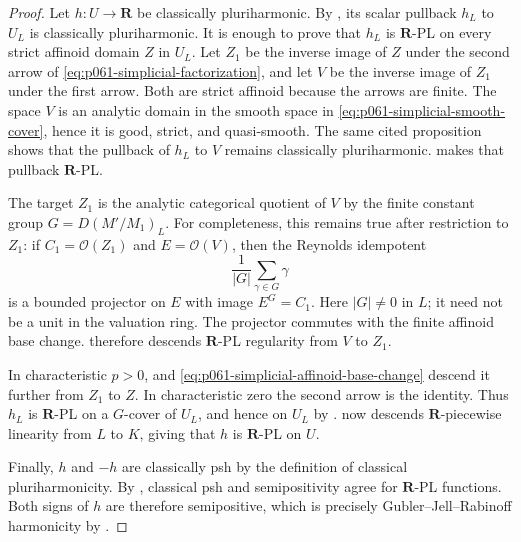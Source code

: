 \begin{proof}
Let \(h:U\to\mathbf R\) be classically pluriharmonic.  By
\cite[Proposition~7.2(6),(7)]{GR25Classical}, its scalar pullback \(h_L\)
to \(U_L\) is classically pluriharmonic.  It is enough to prove that \(h_L\)
is \(\mathbf R\)-PL on every strict affinoid domain \(Z\) in \(U_L\).  Let
\(Z_1\) be the inverse image of \(Z\) under the second arrow of
\eqref{eq:p061-simplicial-factorization}, and let \(V\) be the inverse image
of \(Z_1\) under the first arrow.  Both are strict affinoid because the
arrows are finite.  The space \(V\) is an analytic domain in the smooth
space in \eqref{eq:p061-simplicial-smooth-cover}, hence it is good, strict,
and quasi-smooth.  The same cited proposition shows that the pullback of
\(h_L\) to \(V\) remains classically pluriharmonic.
 makes that pullback \(\mathbf R\)-PL.

The target \(Z_1\) is the analytic categorical quotient of \(V\) by the
finite constant group \(G=D(M'/M_1)_L\).  For completeness, this remains
true after restriction to \(Z_1\): if \(C_1=\mathcal O(Z_1)\) and
\(E=\mathcal O(V)\), then the Reynolds idempotent
\[
                         \frac1{|G|}\sum_{\gamma\in G}\gamma
\]
is a bounded projector on \(E\) with image \(E^G=C_1\).  Here
\(|G|\neq0\) in \(L\); it need not be a unit in the valuation ring.  The
projector commutes with the finite affinoid base change.
 therefore descends
\(\mathbf R\)-PL regularity from \(V\) to \(Z_1\).

In characteristic \(p>0\),
 and
\eqref{eq:p061-simplicial-affinoid-base-change} descend it further from
\(Z_1\) to \(Z\).  In characteristic zero the second arrow is the identity.
Thus \(h_L\) is \(\mathbf R\)-PL on a \(G\)-cover of \(U_L\), and hence on
\(U_L\) by \cite[\S5.2(4)]{GJR26}.
\cite[Corollary~5.12]{GJR26} now descends
\(\mathbf R\)-piecewise linearity from \(L\) to \(K\), giving that \(h\) is
\(\mathbf R\)-PL on \(U\).

Finally, \(h\) and \(-h\) are classically psh by the definition of
classical pluriharmonicity.  By \cite[Theorem~4.3]{GR25Classical}, classical
psh and semipositivity agree for \(\mathbf R\)-PL functions.  Both signs of
\(h\) are therefore semipositive, which is precisely
Gubler--Jell--Rabinoff harmonicity by \cite[Definition~7.2]{GJR26}.
\end{proof}

